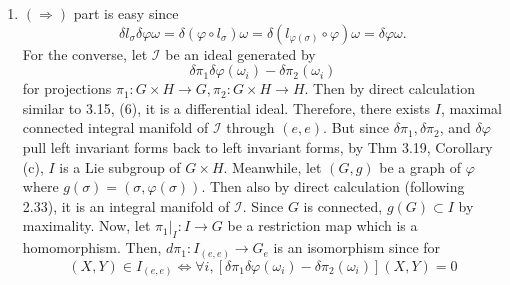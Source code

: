 \begin{enumerate}
For each $i$, we have $f(a_{i}) \in B_{i} \cap B_{i+1}$, and there is some $x_{i} \in \mathcal{X}$ that lies in the same component of $B_{i} \cap B_{i+1}$ as $f(a_{i})$. 
Let $g_{i}$ be a path in $B_{i} \cap B_{i+1}$ from $x_{i}$ to $f(a_{i})$, with the understanding that $x_{0}=x_{k}=q$, and $g_{0}$ and $g_{k}$ are both equal to the constant path $c_{q}$ based at $q$. 
Then, because $g_{i}^{-1} \cdot g_{i}$ is path homotopic to a constant path,
\begin{align*}
f & \sim f_{1} \cdot \ldots \cdot f_{k} \\
& \sim g_{0} \cdot f_{1} \cdot g_{1}^{-1} \cdot g_{1} \cdot f_{2} \cdot g_{2}^{-1} \cdot \ldots \cdot g_{k-1}^{-1} \cdot g_{k-1} \cdot f_{k} \cdot g_{k}^{-1} \\
& \sim \tilde{f}_{1} \cdot \tilde{f}_{2} \cdot \ldots \cdot \tilde{f}_{n}
\end{align*}
where $\tilde{f}_{i}=g_{i-1} \cdot f_{i} \cdot g_{i}^{-1}$. 
For each $i$, $\tilde{f}_{i}$ is a path in $U_{i}$ from $x_{i-1}$ to $x_{i}$. 
Since $B_{i}$ is simply connected, $\tilde{f}_{i}$ is path homotopic to $p_{x_{i-1}, x_{i}}^{U_{i}}$. 
It follows that $f$ is path homotopic to a special loop, as claimed.
\item $(\Rightarrow)$ part is easy since
\[\delta l_{\sigma} \delta \varphi \omega=\delta(\varphi \circ l_{\sigma}) \omega
=\delta(l_{\varphi(\sigma)} \circ \varphi) \omega=\delta \varphi \omega.\]
For the converse, let $\mathcal{I}$ be an ideal generated by
\[\delta \pi_{1} \delta \varphi(\omega_{i})-\delta \pi_{2}(\omega_{i})\]
for projections $\pi_{1}\colon G \times H \rightarrow G, \pi_{2}\colon G \times H \rightarrow H$. 
Then by direct calculation similar to 3.15, (6), it is a differential ideal. 
Therefore, there exists $I$, maximal connected integral manifold of $\mathcal{I}$ through $(e, e)$. 
But since $\delta \pi_{1}, \delta \pi_{2}$, and $\delta \varphi$ pull left invariant forms back to left invariant forms, 
by Thm 3.19, Corollary (c), $I$ is a Lie subgroup of $G \times H$.
Meanwhile, let $(G, g)$ be a graph of $\varphi$ where $g(\sigma)=(\sigma, \varphi(\sigma))$. 
Then also by direct calculation (following 2.33), it is an integral manifold of $\mathcal{I}$. 
Since $G$ is connected, $g(G) \subset I$ by maximality. 
Now, let $\pi_{1}|_{I}\colon I \rightarrow G$ be a restriction map which is a homomorphism. 
Then, $d \pi_{1}\colon I_{(e, e)} \rightarrow G_{e}$ is an isomorphism since for
\[(X, Y) \in I_{(e, e)} \Leftrightarrow 
\forall i, [\delta \pi_{1} \delta \varphi(\omega_{i})-\delta \pi_{2}(\omega_{i})](X, Y)=0 
\]
\end{enumerate}

